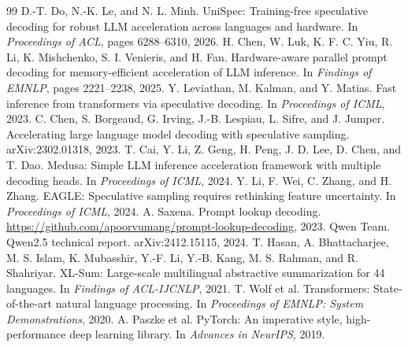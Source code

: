 \documentclass{article}
\begin{document}
{\small
\begin{thebibliography}{99}
 D.-T. Do, N.-K. Le, and N. L. Minh. UniSpec: Training-free speculative decoding for robust LLM acceleration across languages and hardware. In \emph{Proceedings of ACL}, pages 6288--6310, 2026.
 H. Chen, W. Luk, K. F. C. Yiu, R. Li, K. Mishchenko, S. I. Venieris, and H. Fan. Hardware-aware parallel prompt decoding for memory-efficient acceleration of LLM inference. In \emph{Findings of EMNLP}, pages 2221--2238, 2025.
 Y. Leviathan, M. Kalman, and Y. Matias. Fast inference from transformers via speculative decoding. In \emph{Proceedings of ICML}, 2023.
 C. Chen, S. Borgeaud, G. Irving, J.-B. Lespiau, L. Sifre, and J. Jumper. Accelerating large language model decoding with speculative sampling. arXiv:2302.01318, 2023.
 T. Cai, Y. Li, Z. Geng, H. Peng, J. D. Lee, D. Chen, and T. Dao. Medusa: Simple LLM inference acceleration framework with multiple decoding heads. In \emph{Proceedings of ICML}, 2024.
 Y. Li, F. Wei, C. Zhang, and H. Zhang. EAGLE: Speculative sampling requires rethinking feature uncertainty. In \emph{Proceedings of ICML}, 2024.
 A. Saxena. Prompt lookup decoding. \url{https://github.com/apoorvumang/prompt-lookup-decoding}, 2023.
 Qwen Team. Qwen2.5 technical report. arXiv:2412.15115, 2024.
 T. Hasan, A. Bhattacharjee, M. S. Islam, K. Mubasshir, Y.-F. Li, Y.-B. Kang, M. S. Rahman, and R. Shahriyar. XL-Sum: Large-scale multilingual abstractive summarization for 44 languages. In \emph{Findings of ACL-IJCNLP}, 2021.
 T. Wolf et al. Transformers: State-of-the-art natural language processing. In \emph{Proceedings of EMNLP: System Demonstrations}, 2020.
 A. Paszke et al. PyTorch: An imperative style, high-performance deep learning library. In \emph{Advances in NeurIPS}, 2019.
\end{thebibliography}
}
\end{document}
